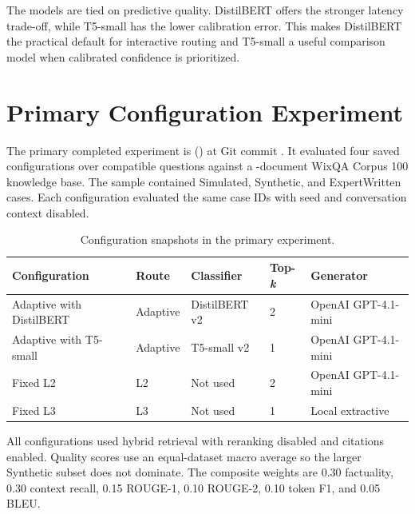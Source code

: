 The models are tied on predictive quality. DistilBERT offers the stronger
latency trade-off, while T5-small has the lower calibration error. This makes
DistilBERT the practical default for interactive routing and T5-small a useful
comparison model when calibrated confidence is prioritized.

\section{Primary Configuration Experiment}

The primary completed experiment is \textit{\PrimaryExperimentName}
(\Code{\PrimaryExperimentID}) at Git commit
\Code{\PrimaryExperimentCommit}. It evaluated four saved configurations over
\PrimaryExperimentCases{} compatible questions against a
\PrimaryExperimentKBDocuments-document WixQA Corpus 100 knowledge base. The
sample contained \PrimarySimulatedCases{} Simulated,
\PrimarySyntheticCases{} Synthetic, and \PrimaryExpertCases{} ExpertWritten
cases. Each configuration evaluated the same case IDs with seed
\PrimaryExperimentSeed{} and conversation context disabled.

\begin{table}[H]
  \centering
  \caption{Configuration snapshots in the primary experiment.}
  \label{tab:primary-configurations}
  \small
  \begin{tabularx}{\textwidth}{p{}p{}p{}p{}X}
    \toprule
    Configuration & Route & Classifier & Top-\textit{k} & Generator\\
    \midrule
    Adaptive with DistilBERT & Adaptive & DistilBERT v2 & 2 & OpenAI GPT-4.1-mini\\
    Adaptive with T5-small & Adaptive & T5-small v2 & 1 & OpenAI GPT-4.1-mini\\
    Fixed L2 & L2 & Not used & 2 & OpenAI GPT-4.1-mini\\
    Fixed L3 & L3 & Not used & 1 & Local extractive\\
    \bottomrule
  \end{tabularx}
\end{table}

All configurations used hybrid retrieval with reranking disabled and citations
enabled. Quality scores use an equal-dataset macro average so the larger
Synthetic subset does not dominate. The composite weights are 0.30 factuality,
0.30 context recall, 0.15 ROUGE-1, 0.10 ROUGE-2, 0.10 token F1, and 0.05 BLEU.

